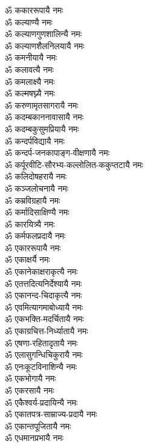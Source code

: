 \begin{multicols}{2}
\begin{flushleft}
ॐ ककाररूपायै नमः\\
ॐ कल्याण्यै नमः\\
ॐ कल्याणगुणशालिन्यै नमः\\
ॐ कल्याणशैलनिलयायै नमः\\
ॐ कमनीयायै नमः\\
ॐ कलावत्यै नमः\\
ॐ कमलाक्ष्यै नमः\\
ॐ कल्मषघ्न्यै नमः\\
ॐ करुणामृतसागरायै नमः\\
ॐ कदम्बकाननावासायै नमः\hfill {}\\
ॐ कदम्बकुसुमप्रियायै नमः\\
ॐ कन्दर्पविद्यायै नमः\\
ॐ कन्दर्प-जनकापाङ्ग-वीक्षणायै नमः\\
ॐ कर्पूरवीटि-सौरभ्य-कल्लोलित-ककुप्तटायै नमः\\
ॐ कलिदोषहरायै नमः\\
ॐ कञ्जलोचनायै नमः\\
ॐ कम्रविग्रहायै नमः\\
ॐ कर्मादिसाक्षिण्यै नमः\\
ॐ कारयित्र्यै नमः\\
ॐ कर्मफलप्रदायै नमः\hfill {}\\
ॐ एकाररूपायै नमः\\
ॐ एकाक्षर्यै नमः\\
ॐ एकानेकाक्षराकृत्यै नमः\\
ॐ एतत्तदित्यनिर्देश्यायै नमः\\
ॐ एकानन्द-चिदाकृत्यै नमः\\
ॐ एवमित्यागमाबोध्यायै नमः\\
ॐ एकभक्ति-मदर्चितायै नमः\\
ॐ एकाग्रचित्त-निर्ध्यातायै नमः\\
ॐ एषणा-रहितादृतायै नमः\\
ॐ एलासुगन्धिचिकुरायै नमः\hfill {}\\
ॐ एनःकूटविनाशिन्यै नमः\\
ॐ एकभोगायै नमः\\
ॐ एकरसायै नमः\\
ॐ एकैश्वर्य-प्रदायिन्यै नमः\\
ॐ एकातपत्र-साम्राज्य-प्रदायै नमः\\
ॐ एकान्तपूजितायै नमः\\
ॐ एधमानप्रभायै नमः\\

\end{flushleft}
\end{multicols}
